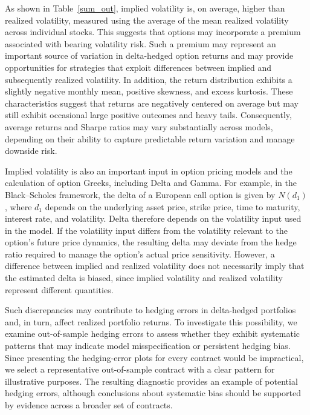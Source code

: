 \documentclass[oneside, 12pt]{article}
\newcommand*{\1}{\text{\scalebox{1.1}{\usefont{U}{bbold}{m}{n}1}}}
\begin{document}
As shown in Table~\ref{sum_out}, implied volatility is, on average, higher than realized volatility, measured using the average of the mean realized volatility across individual stocks. This suggests that options may incorporate a premium associated with bearing volatility risk. Such a premium may represent an important source of variation in delta-hedged option returns and may provide opportunities for strategies that exploit differences between implied and subsequently realized volatility. In addition, the return distribution exhibits a slightly negative monthly mean, positive skewness, and excess kurtosis. These characteristics suggest that returns are negatively centered on average but may still exhibit occasional large positive outcomes and heavy tails. Consequently, average returns and Sharpe ratios may vary substantially across models, depending on their ability to capture predictable return variation and manage downside risk. \newline

Implied volatility is also an important input in option pricing models and the calculation of option Greeks, including Delta and Gamma. For example, in the Black--Scholes framework, the delta of a European call option is given by \(N(d_1)\), where \(d_1\) depends on the underlying asset price, strike price, time to maturity, interest rate, and volatility. Delta therefore depends on the volatility input used in the model. If the volatility input differs from the volatility relevant to the option's future price dynamics, the resulting delta may deviate from the hedge ratio required to manage the option's actual price sensitivity. However, a difference between implied and realized volatility does not necessarily imply that the estimated delta is biased, since implied volatility and realized volatility represent different quantities. \newline

Such discrepancies may contribute to hedging errors in delta-hedged portfolios and, in turn, affect realized portfolio returns. To investigate this possibility, we examine out-of-sample hedging errors to assess whether they exhibit systematic patterns that may indicate model misspecification or persistent hedging bias. Since presenting the hedging-error plots for every contract would be impractical, we select a representative out-of-sample contract with a clear pattern for illustrative purposes. The resulting diagnostic provides an example of potential hedging errors, although conclusions about systematic bias should be supported by evidence across a broader set of contracts.
\end{document}
